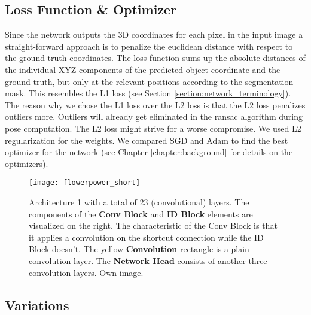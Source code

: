 \subsection{Loss Function \& Optimizer}

Since the network outputs the 3D coordinates for each pixel in the input image a straight-forward approach is to penalize the euclidean distance with respect to the ground-truth coordinates. The loss function sums up the absolute distances of the individual XYZ components of the predicted object coordinate and the ground-truth, but only at the relevant positions according to the segmentation mask. This resembles the L1 loss (see Section \ref{section:network_terminology}). The reason why we chose the L1 loss over the L2 loss is that the L2 loss penalizes outliers more. Outliers will already get eliminated in the \gls{ransac} algorithm during pose computation. The L2 loss might strive for a worse compromise. We used L2 regularization for the weights. We compared SGD and Adam to find the best optimizer for the network (see Chapter \ref{chapter:background} for details on the optimizers).

\begin{figure}[!tbp]
	\centering
    \texttt{[image: flowerpower\_short]}
    \caption{Architecture 1 with a total of 23 (convolutional) layers. The components of the \textbf{Conv Block} and \textbf{ID Block} elements are visualized on the right. The characteristic of the Conv Block is that it applies a convolution on the shortcut connection while the ID Block doesn't. The yellow \textbf{Convolution} rectangle is a plain convolution layer. The \textbf{Network Head} consists of another three convolution layers. Own image.}
    	\label{fig:network_architecture}
\end{figure}

\subsection{Variations} \label{section:network_variations}

